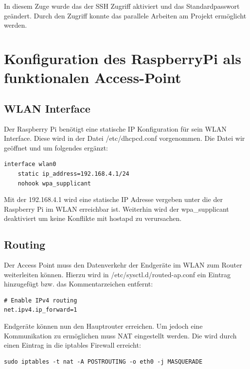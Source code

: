 \documentclass[a4paper,11pt,singlespacing]{article}
\begin{document}
        In diesem Zuge wurde das der SSH Zugriff aktiviert und das Standardpasswort geändert. Durch den  Zugriff konnte das parallele Arbeiten am Projekt ermöglicht werden. 
    	\section{Konfiguration des RaspberryPi als funktionalen Access-Point}
            \subsection{WLAN Interface}
                Der Raspberry Pi benötigt eine statische IP Konfiguration für sein WLAN Interface. Diese wird in der Datei /etc/dhcpcd.conf vorgenommen. Die Datei wir geöffnet und um folgendes ergänzt:\\
                \lstset{
                language=bash,
                }
                \begin{lstlisting}
interface wlan0
    static ip_address=192.168.4.1/24
    nohook wpa_supplicant
                \end{lstlisting} 
                Mit der 192.168.4.1 wird eine statische IP Adresse vergeben unter die der Raspberry Pi im WLAN erreichbar ist. Weiterhin wird der wpa{\_}supplicant deaktiviert um keine Konflikte mit hostapd zu verursachen. 
            
            \subsection{Routing}
                Der Access Point muss den Datenverkehr der Endgeräte im WLAN zum Router weiterleiten können.
                Hierzu wird in /etc/sysctl.d/routed-ap.conf ein Eintrag hinzugefügt bzw. das Kommentarzeichen entfernt:\\
                \lstset{
                language=bash,
                }

                \begin{lstlisting}
# Enable IPv4 routing
net.ipv4.ip_forward=1
                \end{lstlisting} 
                Endgeräte können nun den Hauptrouter erreichen. Um jedoch eine Kommunikation zu ermöglichen muss NAT eingestellt werden. Die wird durch einen Eintrag in die iptables Firewall erreicht: \\
            
                \begin{lstlisting}
sudo iptables -t nat -A POSTROUTING -o eth0 -j MASQUERADE
                \end{lstlisting} 
       
\end{document}

